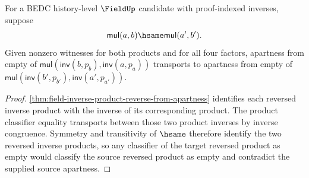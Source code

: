 \begin{theorem}
\label{thm:field-inverse-product-reverse-apart-empty-transport-from-product-hsame}
For a BEDC history-level $\FieldUp$ candidate with proof-indexed inverses,
suppose
$$
\mathsf{mul}(a,b)\hsame\mathsf{mul}(a',b').
$$
Given nonzero witnesses for both products and for all four factors, apartness
from empty of
$\mathsf{mul}(\mathsf{inv}(b,p_b),\mathsf{inv}(a,p_a))$ transports to
apartness from empty of
$\mathsf{mul}(\mathsf{inv}(b',p_{b'}),\mathsf{inv}(a',p_{a'}))$.
\end{theorem}
\begin{proof}
\autoref{thm:field-inverse-product-reverse-from-apartness} identifies each
reversed inverse product with the inverse of its corresponding product.
The product classifier equality transports between those two product inverses
by inverse congruence. Symmetry and transitivity of $\hsame$ therefore identify
the two reversed inverse products, so any classifier of the target reversed
product as empty would classify the source reversed product as empty and
contradict the supplied source apartness.
\end{proof}

